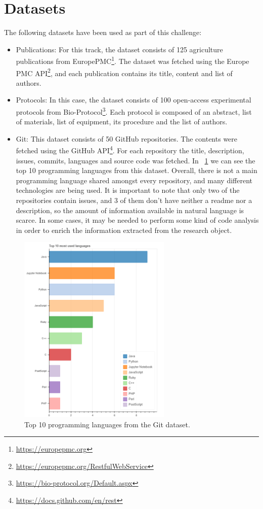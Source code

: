 \documentclass[runningheads]{llncs}
\begin{document}
\section{Datasets} \label{datasets}
The following datasets have been used as part of this challenge:
\begin{itemize}
	\item Publications: For this track, the dataset consists of 125 agriculture publications from EuropePMC\footnote{\url{https://europepmc.org}}. The dataset was fetched using the Europe PMC API\footnote{\url{https://europepmc.org/RestfulWebService}}, and each publication contains its title, content and list of authors.
	\item Protocols: In this case, the dataset consists of 100 open-access experimental protocols from Bio-Protocol\footnote{\url{https://bio-protocol.org/Default.aspx}}. Each protocol is composed of an abstract, list of materials, list of equipment, its procedure and the list of authors.
	\item Git: This dataset consists of 50 GitHub repositories. The contents were fetched using the GitHub API\footnote{\url{https://docs.github.com/en/rest}}. For each repository the title, description, issues, commits, languages and source code was fetched. In  \figurename~\ref{git_languages} we can see the top 10 programming languages from this dataset. Overall, there is not a main programming language shared amongst every repository, and many different technologies are being used. It is important to note that only two of the repositories contain issues, and 3 of them don't have neither a readme nor a description, so the amount of information available in natural language is scarce. In some cases, it may be needed to perform some kind of code analysis in order to enrich the information extracted from the research object. 
\end{itemize}

\begin{figure}[h]
	\begin{center}
	\includegraphics[width=0.65\textwidth]{img/git_languages.png}
	\caption{Top 10 programming languages from the Git dataset.} \label{git_languages}
	\end{center}
\end{figure}
\end{document}
